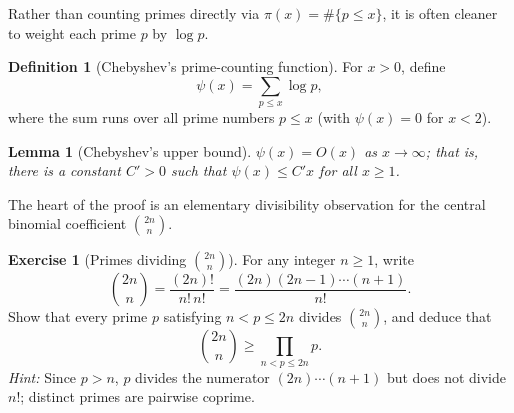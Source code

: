 \documentclass[11pt]{article}
\theoremstyle{plain}
\newtheorem{lemma}[theorem]{Lemma}
\theoremstyle{definition}
\newtheorem{definition}[theorem]{Definition}
\newtheorem{exercise}[theorem]{Exercise}
\theoremstyle{boldremark}
\theoremstyle{remark}
\numberwithin{equation}{section}
\begin{document}
Rather than counting primes directly via $\pi(x)=\#\{p\leq x\}$, it is
often cleaner to weight each prime $p$ by $\log p$.

\begin{definition}[Chebyshev's prime-counting function]
For $x>0$, define
\[
 \psi(x) = \sum_{p\leq x} \log p,
\]
where the sum runs over all prime numbers $p\leq x$ (with $\psi(x)=0$ for
$x<2$).
\end{definition}

\begin{lemma}[Chebyshev's upper bound]\label{lem:chebyshev}
$\psi(x) = O(x)$ as $x\to\infty$; that is, there is a constant $C'>0$ such
that $\psi(x)\leq C'x$ for all $x\geq 1$.
\end{lemma}

The heart of the proof is an elementary divisibility observation for the
central binomial coefficient $\binom{2n}{n}$.

\begin{exercise}[Primes dividing $\binom{2n}{n}$]\label{ex:central-binom}
For any integer $n\geq 1$, write
\[
 \binom{2n}{n} = \frac{(2n)!}{n!\,n!} = \frac{(2n)(2n-1)\cdots(n+1)}{n!}.
\]
Show that every prime $p$ satisfying $n < p \leq 2n$ divides $\binom{2n}{n}$,
and deduce that
\[
 \binom{2n}{n} \geq \prod_{n < p \leq 2n} p.
\]
\emph{Hint:} Since $p > n$, $p$ divides the numerator $(2n)\cdots(n+1)$ but
does not divide $n!$; distinct primes are pairwise coprime.
\end{exercise}
\end{document}
